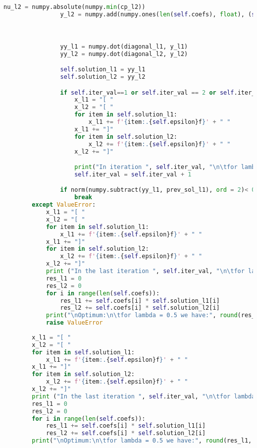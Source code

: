 \documentclass[12pt, legalpaper]{exam}
\begin{document}
\begin{lstlisting}[language=Python, caption=Программа на Python, label=lst:python-code]
                nu_l2 = numpy.absolute(numpy.min(cp_l2))
                y_l2 = numpy.add(numpy.ones(len(self.coefs), float), (self.alpha2/nu_l2) * cp_l2)



                yy_l1 = numpy.dot(diagonal_l1, y_l1)
                yy_l2 = numpy.dot(diagonal_l2, y_l2)

                self.solution_l1 = yy_l1
                self.solution_l2 = yy_l2

                if self.iter_val==1 or self.iter_val == 2 or self.iter_val == 3 or self.iter_val == 4:
                    x_l1 = "[ "
                    x_l2 = "[ "
                    for item in self.solution_l1:
                        x_l1 += f'{item:.{self.epsilon}f}' + " "
                    x_l1 += "]"
                    for item in self.solution_l2:
                        x_l2 += f'{item:.{self.epsilon}f}' + " "
                    x_l2 += "]"

                    print("In iteration ", self.iter_val, "\n\tfor lambda = 0.5 we have x = ", x_l1, "\n\tfor lambda = 0.9 we have x = ", x_l2)
                    self.iter_val = self.iter_val + 1

                if norm(numpy.subtract(yy_l1, prev_sol_l1), ord = 2)< 0.00001 or norm(numpy.subtract(yy_l2, prev_sol_l2), ord = 2)< 0.00001:
                    break
        except ValueError:
            x_l1 = "[ "
            x_l2 = "[ "
            for item in self.solution_l1:
                x_l1 += f'{item:.{self.epsilon}f}' + " "
            x_l1 += "]"
            for item in self.solution_l2:
                x_l2 += f'{item:.{self.epsilon}f}' + " "
            x_l2 += "]"
            print ("In the last iteration ", self.iter_val, "\n\tfor lambda = 0.5 we have x = " , x_l1, "\n\tfor lambda = 0.9 we have x = ", x_l2)
            res_l1 = 0
            res_l2 = 0
            for i in range(len(self.coefs)):
                res_l1 += self.coefs[i] * self.solution_l1[i]
                res_l2 += self.coefs[i] * self.solution_l2[i]
            print("\nOptimum:\n\tfor lambda = 0.5 we have:", round(res_l1, self.epsilon), "\n\tfor lambda = 0.9 we have", round(res_l2, self.epsilon))
            raise ValueError
        
        x_l1 = "[ "
        x_l2 = "[ "
        for item in self.solution_l1:
            x_l1 += f'{item:.{self.epsilon}f}' + " "
        x_l1 += "]"
        for item in self.solution_l2:
            x_l2 += f'{item:.{self.epsilon}f}' + " "
        x_l2 += "]"
        print ("In the last iteration ", self.iter_val, "\n\tfor lambda = 0.5 we have x = " , x_l1, "\n\tfor lambda = 0.9 we have x = ", x_l2)
        res_l1 = 0
        res_l2 = 0
        for i in range(len(self.coefs)):
            res_l1 += self.coefs[i] * self.solution_l1[i]
            res_l2 += self.coefs[i] * self.solution_l2[i]
        print("\nOptimum:\n\tfor lambda = 0.5 we have:", round(res_l1, self.epsilon), "\n\tfor lambda = 0.9 we have", round(res_l2, self.epsilon))
            


\end{lstlisting}
\end{document}
